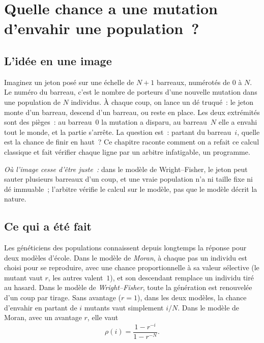 \chapter[La chance d'envahir]{Quelle chance a une mutation d'envahir une population~?}

\section*{L'idée en une image}

\begin{analogie}
Imaginez un jeton posé sur une échelle de $N+1$ barreaux, numérotés de $0$ à $N$. Le numéro du barreau, c'est le
nombre de porteurs d'une nouvelle mutation dans une population de $N$ individus. À chaque coup, on lance un dé truqué~:
le jeton monte d'un barreau, descend d'un barreau, ou reste en place. Les deux extrémités sont des pièges~: au
barreau~$0$ la mutation a disparu, au barreau~$N$ elle a envahi tout le monde, et la partie s'arrête. La question
est~: partant du barreau~$i$, quelle est la chance de finir en haut~? Ce chapitre raconte comment on a refait ce
calcul classique et fait vérifier chaque ligne par un arbitre infatigable, un programme.

\emph{Où l'image cesse d'être juste~:} dans le modèle de Wright--Fisher, le jeton peut sauter plusieurs barreaux d'un
coup, et une vraie population n'a ni taille fixe ni dé immuable~; l'arbitre vérifie le calcul sur le modèle, pas que
le modèle décrit la nature.
\end{analogie}

\section*{Ce qui a été fait}

Les généticiens des populations connaissent depuis longtemps la réponse pour deux modèles d'école. Dans le modèle
de \emph{Moran}, à chaque pas un individu est choisi pour se reproduire, avec une chance proportionnelle à sa
\og valeur sélective\fg{} (le mutant vaut $r$, les autres valent~$1$), et son descendant remplace un individu tiré au
hasard. Dans le modèle de \emph{Wright--Fisher}, toute la génération est renouvelée d'un coup par tirage. Sans
avantage ($r=1$), dans les deux modèles, la chance d'envahir en partant de $i$ mutants vaut simplement $i/N$. Dans
le modèle de Moran, avec un avantage $r$, elle vaut
\[
\rho(i)=\frac{1-r^{-i}}{1-r^{-N}} .
\]

